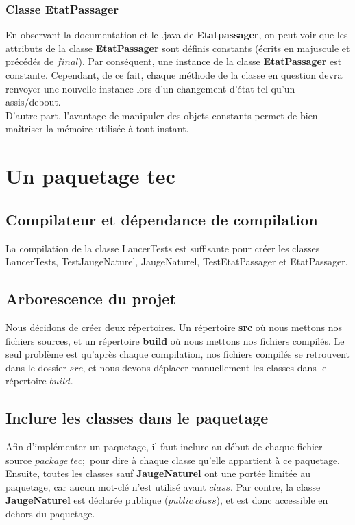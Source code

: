 \documentclass[a4paper,11pts]{article}
\begin{document}
\subsubsection{Classe EtatPassager}
En observant la documentation et le .java de \textbf{Etatpassager}, on peut voir que les attributs de la classe \textbf{EtatPassager} sont définis constants (écrits en majuscule et précédés de $final$). Par conséquent, une instance de la classe \textbf{EtatPassager} est constante. Cependant, de ce fait, chaque méthode de la classe en question devra renvoyer une nouvelle instance lors d'un changement d'état tel qu'un assis/debout.\\
D'autre part, l'avantage de manipuler des objets constants permet de bien maîtriser la mémoire utilisée à tout instant.

\section{Un paquetage tec}
\subsection{Compilateur et dépendance de compilation}
La compilation de la classe LancerTests est suffisante pour créer les classes LancerTests, TestJaugeNaturel, JaugeNaturel, TestEtatPassager et EtatPassager.

\subsection{Arborescence du projet}
Nous décidons de créer deux répertoires. Un répertoire \textbf{src} où nous mettons nos fichiers sources, et un répertoire \textbf{build} où nous mettons nos fichiers compilés. Le seul problème est qu'après chaque compilation, nos fichiers compilés se retrouvent dans le dossier $src$, et nous devons déplacer manuellement les classes dans le répertoire $build$.

\subsection{Inclure les classes dans le paquetage}
Afin d'implémenter un paquetage, il faut inclure au début de chaque fichier source $package\ tec;$ pour dire à chaque classe qu'elle appartient à ce paquetage. Ensuite, toutes les classes sauf \textbf{JaugeNaturel} ont une portée limitée au paquetage, car aucun mot-clé n'est utilisé avant $class$. Par contre, la classe \textbf{JaugeNaturel} est déclarée publique ($public\ class$), et est donc accessible en dehors du paquetage.
\end{document}
